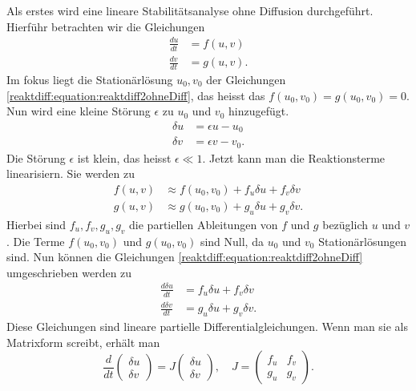 Als erstes wird eine lineare Stabilitätsanalyse ohne Diffusion durchgeführt.
Hierführ betrachten wir die Gleichungen
\begin{align}
    \label{reaktdiff:equation:reaktdiff2ohneDiff}
    \frac{du}{dt} &= f(u,v)\\
    \frac{dv}{dt} &= g(u,v).
\end{align}
Im fokus liegt die Stationärlösung \(u_0, v_0\) der Gleichungen \ref{reaktdiff:equation:reaktdiff2ohneDiff}, das heisst das \(f(u_0,v_0) = g(u_0,v_0) = 0\).
Nun wird eine kleine Störung \(\epsilon\) zu \(u_0\) und \(v_0\) hinzugefügt.
\begin{align}
    \delta u &= \epsilon u - u_0 \\
    \delta v &= \epsilon v - v_0.
\end{align}
Die Störung \(\epsilon\) ist klein, das heisst \(\epsilon \ll 1\).
Jetzt kann man die Reaktionsterme linearisiern.
Sie werden zu
\begin{align}
    f(u,v) &\approx f(u_0,v_0) + f_u \delta u + f_v\delta v\\
    g(u,v) &\approx g(u_0,v_0) + g_u \delta u + g_v\delta v.
\end{align}
Hierbei sind \(f_u, f_v, g_u, g_v\) die partiellen Ableitungen von \(f\) und \(g\) bezüglich \(u\) und \(v\).
Die Terme \(f(u_0,v_0)\) und \(g(u_0,v_0)\) sind Null, da \(u_0\) und \(v_0\) Stationärlösungen sind.
Nun können die Gleichungen \ref{reaktdiff:equation:reaktdiff2ohneDiff} umgeschrieben werden zu
\begin{align}
    \label{reaktdiff:equation:reaktdiff2ohneDifflinearisiert1}
    \frac{d \delta u}{dt} &= f_u \delta u + f_v \delta v\\
    \label{reaktdiff:equation:reaktdiff2ohneDifflinearisiert2}
    \frac{d \delta v}{dt} &= g_u \delta u + g_v \delta v.
\end{align}
Diese Gleichungen sind lineare partielle Differentialgleichungen.
Wenn man sie als Matrixform screibt, erhält man
\begin{equation}
    \label{reaktdiff:equation:reaktdiff2ohneDiffmatrix}
    \frac{d}{dt} \begin{pmatrix}
        \delta u\\
        \delta v
    \end{pmatrix} = 
    J 
    \begin{pmatrix}
        \delta u\\
        \delta v
    \end{pmatrix}
    , \quad
    J =
    \begin{pmatrix}
        f_u & f_v\\
        g_u & g_v
    \end{pmatrix}.
\end{equation}

